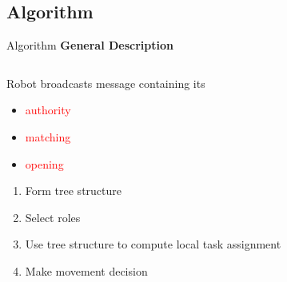\documentclass[10pt]{beamer}
\begin{document}
\subsection{Algorithm}
\begin{frame}{Algorithm}
  \textbf{General Description}
  \begin{columns}[T] %
   \begin{column}{.45\textwidth}
     Robot broadcasts message containing its
     \begin{itemize}
     \item \textcolor{red}{authority} 
     \item \textcolor{red}{matching}
     \item \textcolor{red}{opening}
     \end{itemize}

     \begin{enumerate}
     \item Form tree structure
     \item Select roles
     \item Use tree structure to compute local task assignment
     \item Make movement decision
     \end{enumerate}
    \end{column}%
    \begin{column}{.45\textwidth}
      
    \end{column}%
  \end{columns}
\end{frame}
\end{document}
